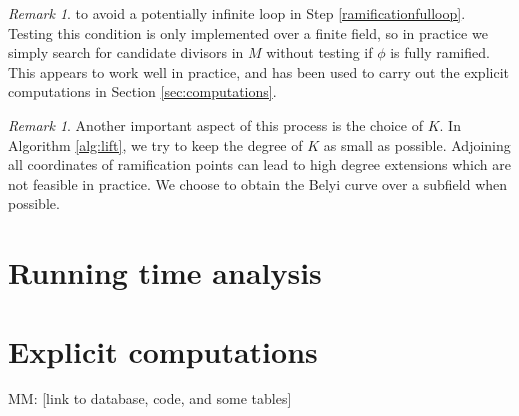 \documentclass{dcthesis}
\newcommand{\mm}[1]{{\color{blue} \sf MM: [#1]}}
\theoremstyle{definition}
\theoremstyle{remark}
\newtheorem{remark}[prop]{Remark}
\numberwithin{equation}{section}
\numberwithin{figure}{section}
\begin{document}
{{\begin{remark}
      to avoid a potentially infinite loop in
      Step \ref{ramificationfulloop}.
      Testing this condition is only implemented over
      a finite field,
      so in practice we simply search for candidate divisors
      in $M$ without testing if $\phi$ is fully ramified.
      This appears to work well in practice,
      and has been used to carry out the explicit computations
      in Section \ref{sec:computations}.
    \end{remark}
    \begin{remark}
      \label{rmk:basefield}
      Another important aspect of this process is the choice of $K$.
      In Algorithm \ref{alg:lift},
      we try to keep the degree of $K$ as small as possible.
      Adjoining all coordinates of ramification points
      can lead to high degree extensions
      which are not feasible in practice.
      We choose to obtain the Belyi curve
      over a subfield when possible.
    \end{remark}
  }
  \section{Running time analysis}{\label{sec:runtime}
  }
  \section{Explicit computations}{\label{sec:computations}
    \mm{link to database, code, and some tables}
  }
} 
\end{document}
